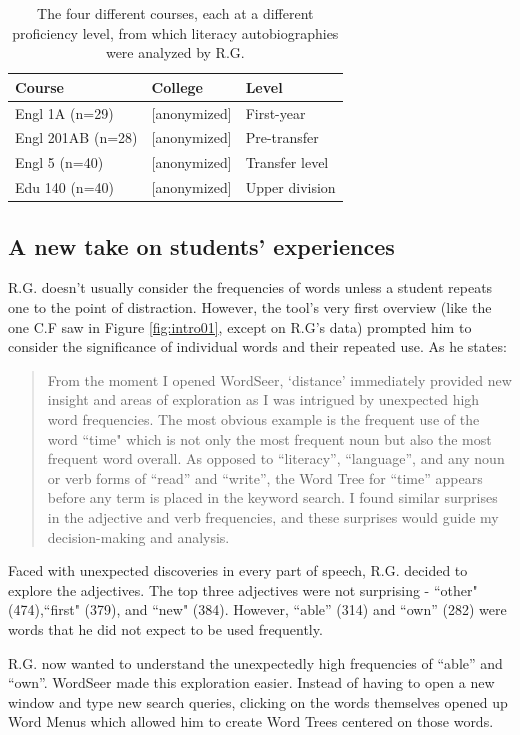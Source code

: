 \documentclass{sig-alternate}
\begin{document}
\begin{table}
\begin{tabular}{lll}
Course& College & Level \\
\hline
Engl 1A (n=29) & [anonymized] & First-year \\
Engl 201AB (n=28) & [anonymized] & Pre-transfer \\
Engl 5 (n=40) & [anonymized] & Transfer level \\
Edu 140 (n=40) & [anonymized] & Upper division \\
\end{tabular}
\caption{The four different courses, each at a different proficiency level, from which literacy autobiographies were analyzed by R.G. \label{table:rex-courses}}
\end{table}


 \subsection{A new take on students' experiences}

R.G. doesn't usually consider the frequencies of words unless a student repeats one to the point of distraction. However, the tool's very first overview (like the one C.F saw in Figure \ref{fig:intro01}, except on R.G's data) prompted him to consider the significance of individual words and their repeated use.  As he states:
\begin{quote}
From the moment I opened WordSeer, `distance' immediately provided new insight and areas of exploration as I was intrigued by unexpected high word frequencies.  The most obvious example is the frequent use of the word ``time" which is not only the most frequent noun but also the most frequent word overall.  As opposed to ``literacy'', ``language'', and any noun or verb forms of ``read'' and ``write'', the Word Tree for ``time'' appears before any term is placed in the keyword search.   I found similar surprises in the adjective and verb frequencies, and these surprises would guide my decision-making and analysis.
\end{quote}
Faced with unexpected discoveries in every part of speech, R.G. decided to explore the adjectives. The top three adjectives were not surprising - ``other" (474),``first" (379), and ``new" (384).  However,  ``able'' (314) and ``own'' (282) were words that he did not expect to be used frequently.

R.G. now wanted to understand the unexpectedly high frequencies of ``able'' and ``own''. WordSeer made this exploration easier. Instead of having to open a new window and type new search queries, clicking on the words themselves opened up Word Menus which allowed him to create Word Trees centered on those words.
\end{document}
